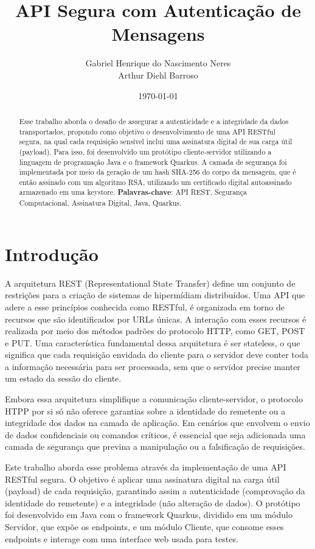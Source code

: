 \documentclass[12pt]{article}
\title{API Segura com Autenticação de Mensagens}
\author{Gabriel Henrique do Nascimento Neres \\ Arthur Diehl Barroso}
\date{\today}
\begin{document}
\maketitle

\begin{abstract}
    
    Esse trabalho aborda o desafio de assegurar a autenticidade e a integridade da dados transportados, propondo como objetivo o desenvolvimento de uma API RESTful segura, na qual cada requisição sensível inclui uma assinatura digital de sua carga útil (payload). Para isso, foi desenvolvido um protótipo cliente-servidor utilizando a linguagem de programação Java e o framework Quarkus. A camada de segurança foi implementada por meio da geração de um hash SHA-256 do corpo da mensagem, que é então assinado com um algoritmo RSA, utilizando um certificado digital autoassinado armazenado em uma keystore.
  \textbf{Palavras-chave}: API REST, Segurança Computacional, Assinatura Digital, Java, Quarkus.
\end{abstract}

\section{Introdução}

A arquitetura REST (Representational State Transfer) define um conjunto de restrições para a criação de sistemas de hipermídiam distribuídos. Uma API que adere a esse princípios conhecida como RESTful, é organizada em torno de recursos que são identificados por URLs únicas. A interação com esses recursos é realizada por meio dos métodos padrões do protocolo HTTP, como GET, POST e PUT. Uma característica fundamental dessa arquitetura é ser stateless, o que significa que cada requisição envidada do cliente para o servidor deve conter toda a informação necessária para ser processada, sem que o servidor precise manter um estado da sessão do cliente.


Embora essa arquitetura simplifique a comunicação cliente-servidor, o protocolo HTPP por si só não oferece garantias sobre a identidade do remetente ou a integridade dos dados na camada de aplicação. Em cenários que envolvem o envio de dados confidenciais ou comandos críticos, é essencial que seja adicionada uma camada de segurança que previna a manipulação ou a falsificação de requisições.

Este trabalho aborda esse problema através da implementação de uma API RESTful segura. O objetivo é aplicar uma assinatura digital na carga útil (payload) de cada requisição, garantindo assim a autenticidade (comprovação da identidade do remetente) e a integridade (não alteração de dados). O protótipo foi desenvolvido em Java com o framework Quarkus, dividido em um módulo Servidor, que expõe os endpoints, e um módulo Cliente, que consome esses endpoints e interage com uma interface web usada para testes.
\end{document}
